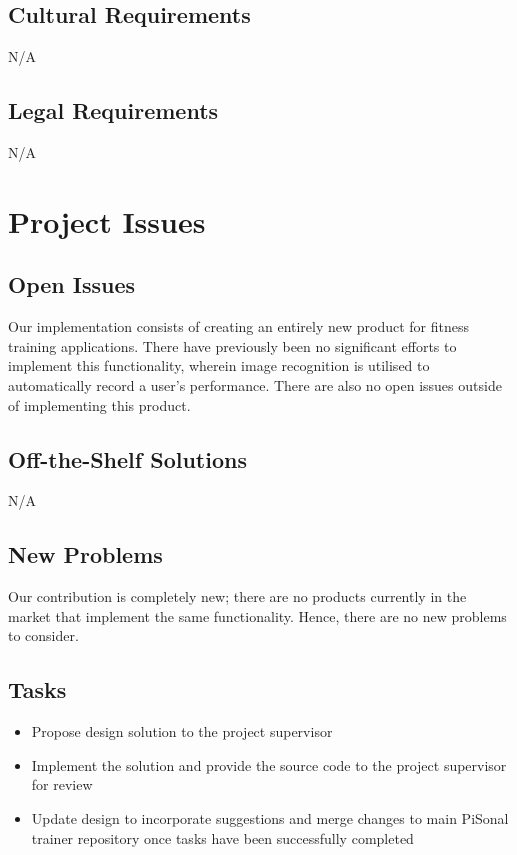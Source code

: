 \documentclass{article}
\begin{document}
\medskip

\subsection{Cultural Requirements}
N/A
\subsection{Legal Requirements}
N/A

\newpage
\section{Project Issues}
\subsection{Open Issues}
Our implementation consists of creating an entirely new product for fitness training applications. There have previously been no significant efforts to implement this functionality, wherein image recognition is utilised to automatically record a user's performance. There are also no open issues outside of implementing this product.

\subsection{Off-the-Shelf Solutions}
N/A

\subsection{New Problems}
Our contribution is completely new; there are no products currently in the market that implement the same functionality. Hence, there are no new problems to consider. 

\subsection{Tasks}
\begin{itemize}
    \item Propose design solution to the project supervisor
    \item Implement the solution and provide the source code to the project supervisor for review
    \item Update design to incorporate suggestions and merge changes to main PiSonal trainer repository once tasks have been successfully completed
\end{itemize}
\end{document}
